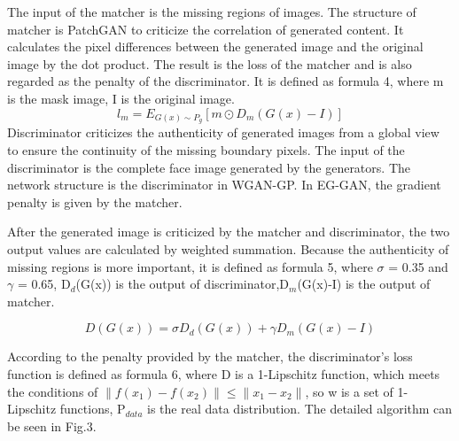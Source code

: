 \documentclass[journal]{IEEEtran}
\begin{document}
The input of the matcher is the missing regions of images. The structure of matcher is PatchGAN\cite{isola2017image} to criticize the correlation of generated content. It calculates the pixel differences between the generated image and the original image by the dot product. The result is the loss of the matcher and is also regarded as the penalty of the discriminator. It is defined as formula 4, where m is the mask image, I is the original image.
\begin{equation}
l_m = E_{G(x)\sim P_g}[m\odot D_m(G(x) - I)]
\end{equation}
Discriminator criticizes the authenticity of generated images from a global view to ensure the continuity of the missing boundary pixels. The input of the discriminator is  the complete face image generated by the generators. The network structure is the discriminator in WGAN-GP\cite{gulrajani2017improved}\cite{arjovsky2017wasserstein}. In EG-GAN, the gradient penalty is given by the matcher.

After the generated image is criticized by the matcher and discriminator, the two output values are calculated by weighted summation. Because the authenticity of missing regions is more important, it is defined as formula 5, where $\sigma$ = 0.35 and $\gamma$ = 0.65, D$_{d}$(G(x)) is the output of discriminator,D$_{m}$(G(x)-I) is the output of matcher.

\begin{equation}
D(G(x)) = \sigma D_d(G(x)) + \gamma D_m(G(x)-I)
\end{equation}

According to the penalty provided by the matcher, the discriminator's loss function is defined as formula 6, where D is a 1-Lipschitz function, which meets the conditions of $\|f(x_1)-f(x_2)\|\leq\|x_1 - x_2\|$, so w is a set of 1-Lipschitz functions, P$_{data}$ is the real data distribution. The detailed algorithm can be seen in Fig.3.
\end{document}
